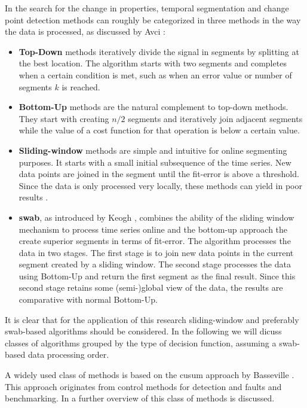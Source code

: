 In the search for the change in properties, temporal segmentation and change point detection methods can roughly be categorized in three methods in the way the data is processed, as discussed by Avci \etal \cite{avci2010activity}:
\begin{itemize}
  \item \textbf{Top-Down} methods iteratively divide the signal in segments by splitting at the best location.
  The algorithm starts with two segments and completes when a certain condition is met, such as when an error value or number of segments $k$ is reached.
  \item \textbf{Bottom-Up} methods are the natural complement to top-down methods.
  They start with creating $n/2$ segments and iteratively join adjacent segments while the value of a cost function for that operation is below a certain value.
  \item \textbf{Sliding-window} methods are simple and intuitive for online segmenting purposes.
  It starts with a small initial subsequence of the time series.
  New data points are joined in the segment until the fit-error is above a threshold.
  Since the data is only processed very locally, these methods can yield in poor results \cite{keogh2001online}.
  \item \textbf{\acrlong{swab}}, as introduced by Keogh \etal \cite{keogh2001online}, combines the ability of the sliding window mechanism to process time series online and the bottom-up approach the create superior segments in terms of fit-error.
  The algorithm processes the data in two stages.
  The first stage is to join new data points in the current segment created by a sliding window.
  The second stage processes the data using Bottom-Up and return the first segment as the final result.
  Since this second stage retains some (semi-)global view of the data, the results are comparative with normal Bottom-Up.
\end{itemize}
It is clear that for the application of this research sliding-window and preferably \gls{swab}-based algorithms should be considered.
In the following we will dicuss classes of algorithms grouped by the type of decision function, assuming a \gls{swab}-based data processing order.

A widely used class of methods is based on the \gls{cusum} approach by Basseville \etal \cite{basseville1993detection}.
This approach originates from control methods for detection and faults and benchmarking.
In  a further overview of this class of methods is discussed.